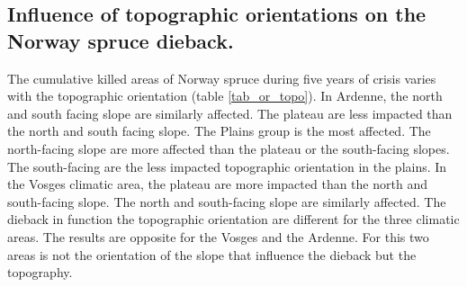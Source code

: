 \documentclass[3p,procedia]{elsarticle}
\begin{document}


	


\subsection{Influence of topographic orientations on the Norway spruce dieback.}

The cumulative killed areas of Norway spruce during five years of crisis varies with the topographic orientation (table \ref{tab_or_topo}).
In Ardenne, the north and south facing slope are similarly affected. 
The plateau are less impacted than the north and south facing slope.
The Plains group is the most affected. 
The north-facing slope are more affected than the plateau or the south-facing slopes.
The south-facing are the less impacted topographic orientation in the plains.
In the Vosges climatic area, the plateau are more impacted than the north and south-facing slope.
The north and south-facing slope are similarly affected.
The dieback in function the topographic orientation are different for the three climatic areas.
The results are opposite for the Vosges and the Ardenne.
For this two areas is not the orientation of the slope that influence the dieback but the topography.
\end{document}
